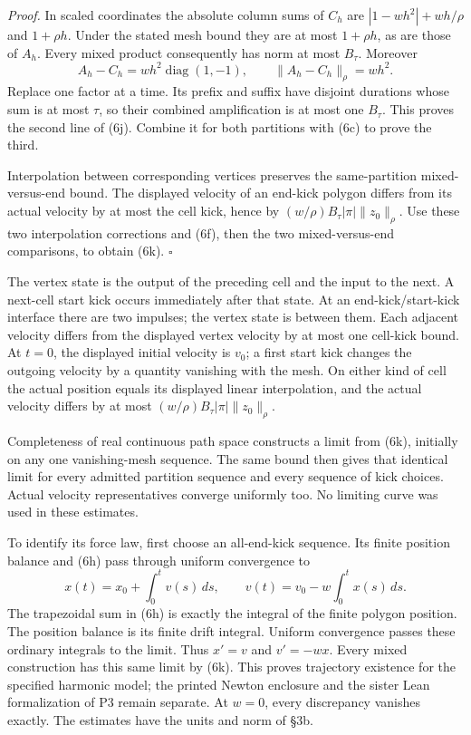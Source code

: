 \documentclass[11pt,a4paper]{article}
\begin{document}
\emph{Proof.} In scaled coordinates the absolute column sums of \(C_h\)
are \(|1-wh^2|+wh/\rho\) and \(1+\rho h\). Under the stated mesh bound
they are at most \(1+\rho h\), as are those of \(A_h\). Every mixed
product consequently has norm at most \(B_\tau\). Moreover
\[A_h-C_h=wh^2\operatorname{diag}(1,-1),\qquad
\|A_h-C_h\|_\rho=wh^2.\] Replace one factor at a time. Its prefix and
suffix have disjoint durations whose sum is at most \(\tau\), so their
combined amplification is at most one \(B_\tau\). This proves the second
line of (6j). Combine it for both partitions with (6c) to prove the
third.

Interpolation between corresponding vertices preserves the
same-partition mixed-versus-end bound. The displayed velocity of an
end-kick polygon differs from its actual velocity by at most the cell
kick, hence by \((w/\rho)B_\tau|\pi|\|z_0\|_\rho\). Use these two
interpolation corrections and (6f), then the two mixed-versus-end
comparisons, to obtain (6k). \(\square\)

The vertex state is the output of the preceding cell and the input to
the next. A next-cell start kick occurs immediately after that state. At
an end-kick/start-kick interface there are two impulses; the vertex
state is between them. Each adjacent velocity differs from the displayed
vertex velocity by at most one cell-kick bound. At \(t=0\), the
displayed initial velocity is \(v_0\); a first start kick changes the
outgoing velocity by a quantity vanishing with the mesh. On either kind
of cell the actual position equals its displayed linear interpolation,
and the actual velocity differs by at most
\((w/\rho)B_\tau|\pi|\|z_0\|_\rho\).

Completeness of real continuous path space constructs a limit from (6k),
initially on any one vanishing-mesh sequence. The same bound then gives
that identical limit for every admitted partition sequence and every
sequence of kick choices. Actual velocity representatives converge
uniformly too. No limiting curve was used in these estimates.

To identify its force law, first choose an all-end-kick sequence. Its
finite position balance and (6h) pass through uniform convergence to
\[x(t)=x_0+\int_0^t v(s)\,ds,\qquad
v(t)=v_0-w\int_0^t x(s)\,ds.\tag{6l}\] The trapezoidal sum in (6h) is
exactly the integral of the finite polygon position. The position
balance is its finite drift integral. Uniform convergence passes these
ordinary integrals to the limit. Thus \(x'=v\) and \(v'=-wx\). Every
mixed construction has this same limit by (6k). This proves trajectory
existence for the specified harmonic model; the printed Newton enclosure
and the sister Lean formalization of P3 remain separate. At \(w=0\),
every discrepancy vanishes exactly. The estimates have the units and
norm of §3b.
\end{document}
